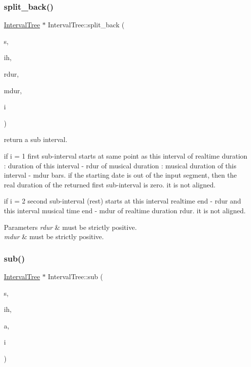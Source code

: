 \subsubsection{\texorpdfstring{split\_back()}{split\_back()}}
{\footnotesize\ttfamily \mbox{\hyperlink{classIntervalTree}{Interval\+Tree}} $\ast$ Interval\+Tree\+::split\+\_\+back (\begin{DoxyParamCaption}\item[{const \mbox{\hyperlink{classInputSegment}{Input\+Segment}} $\ast$}]{s,  }\item[{\mbox{\hyperlink{classIntervalHeap}{Interval\+Heap}} $\ast$}]{ih,  }\item[{double}]{rdur,  }\item[{\mbox{\hyperlink{classRational}{Rational}}}]{mdur,  }\item[{size\+\_\+t}]{i }\end{DoxyParamCaption})}



return a sub interval. 


\begin{DoxyItemize}
\item if i = 1 first sub-\/interval starts at same point as this interval of realtime duration \+: duration of this interval -\/ rdur of musical duration \+: musical duration of this interval -\/ mdur bars. if the starting date is out of the input segment, then the real duration of the returned first sub-\/interval is zero. it is not aligned.
\item if i = 2 second sub-\/interval (rest) starts at this interval realtime end -\/ rdur and this interval musical time end -\/ mdur of realtime duration rdur. it is not aligned.
\end{DoxyItemize}


\begin{DoxyParams}{Parameters}
{\em rdur} & must be strictly positive. \\
\hline
{\em mdur} & must be strictly positive. \\
\hline
\end{DoxyParams}
\mbox{\label{group__segment_gacb8de7e3756951950c391d241adec21c}} 
\subsubsection{\texorpdfstring{sub()}{sub()}}
{\footnotesize\ttfamily \mbox{\hyperlink{classIntervalTree}{Interval\+Tree}} $\ast$ Interval\+Tree\+::sub (\begin{DoxyParamCaption}\item[{const \mbox{\hyperlink{classInputSegment}{Input\+Segment}} $\ast$}]{s,  }\item[{\mbox{\hyperlink{classIntervalHeap}{Interval\+Heap}} $\ast$}]{ih,  }\item[{size\+\_\+t}]{a,  }\item[{size\+\_\+t}]{i }\end{DoxyParamCaption})}



